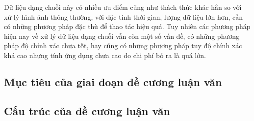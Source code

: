 Dữ liệu dạng chuỗi này có nhiều ưu điểm cũng như thách thức khác hẳn so với xử lý hình ảnh thông thường, với đặc tính thời gian, lượng dữ liệu lớn hơn,
cần có những phương pháp đặc thù để thao tác hiệu quả. Tuy nhiên các phương pháp hiện nay về xử lý dữ liệu dạng chuỗi vẫn còn một số vấn đề,
có những phương pháp độ chính xác chưa tốt, hay cũng có những phương pháp tuy độ chính xác khá cao nhưng tính ứng dụng chưa cao do chi phí bỏ ra là quá lớn.





\subsection{Mục tiêu của giai đoạn đề cương luận văn}


\subsection{Cấu trúc của đề cương luận văn}

